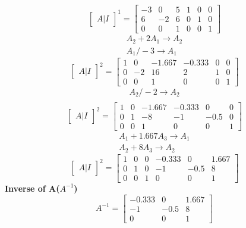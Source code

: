 \documentclass{article}
\begin{document}
\[
\left[
\begin{array}{c|c}
A|I
\end{array}
\right]^1
=
\left[
\begin{array}{ccc|ccc}
   -3 & 0 & 5 & 1 & 0 & 0\\
	6 & -2 & 6 & 0 & 1 & 0\\
	0 & 0 & 1 & 0 & 0 & 1
\end{array}
\right]
\]
\begin{align}
	A_{2}+2A_{1}\rightarrow A_{2}\\
	A_{1}/-3\rightarrow A_{1}
\end{align}
\[
\left[
\begin{array}{c|c}
A|I
\end{array}
\right]^2
=
\left[
\begin{array}{ccc|ccc}
    1 & 0 & -1.667 & -0.333 & 0 & 0\\
	0 & -2 & 16 & 2 & 1 & 0\\
	0 & 0 & 1 & 0 & 0 & 1
\end{array}
\right]
\]
\begin{align}
	A_{2}/-2\rightarrow A_{2}\\
\end{align}
\[
\left[
\begin{array}{c|c}
A|I
\end{array}
\right]^2
=
\left[
\begin{array}{ccc|ccc}
    1 & 0 & -1.667 & -0.333 & 0 & 0\\
	0 & 1 & -8 & -1 & -0.5 & 0\\
	0 & 0 & 1 & 0 & 0 & 1
\end{array}
\right]
\]
\begin{align}
	A_{1}+1.667A_{3}\rightarrow A_{1}\\
	A_{2}+8A_{3}\rightarrow A_{2}
\end{align}
\[
\left[
\begin{array}{c|c}
A|I
\end{array}
\right]^2
=
\left[
\begin{array}{ccc|ccc}
    1 & 0 & 0 & -0.333 & 0 & 1.667\\
	0 & 1 & 0 & -1 & -0.5 & 8\\
	0 & 0 & 1 & 0 & 0 & 1
\end{array}
\right]
\]
\textbf{Inverse of A($A^{-1}$)}
\[
A^{-1}
=
\begin{bmatrix}
	-0.333 & 0 & 1.667\\
	-1 & -0.5 & 8\\
	 0 & 0 & 1
\end{bmatrix}
\]
\end{document}
